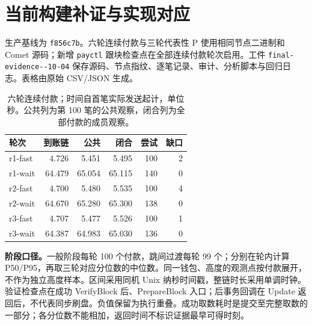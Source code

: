 \section{当前构建补证与实现对应}
\label{supp:final-evidence}
生产基线为 \texttt{f856c7b}。六轮连续付款与三轮代表性 P 使用相同节点二进制和 Comet 源码；新增 \texttt{payctl} 跟块检查点在全部连续付款轮次启用。工件 \texttt{final-evidence--10-04} 保存源码、节点指纹、逐笔记录、审计、分析脚本与回归日志。表格由原始 CSV/JSON 生成。

\begin{table}[htbp]
\centering\small
\caption{六轮连续付款；时间自首笔实际发送起计，单位秒。公共列为第 100 笔的公共观察，闭合列为全部付款的成员观察。}
\label{tab:final-evidence-chain}
\begin{tabular}{lrrrrr}\toprule
轮次 & 到账链 & 公共 & 闭合 & 尝试 & 缺口 \\\midrule
r1-fast & 4.726 & 5.451 & 5.495 & 100 & 2 \\
r1-wait & 64.479 & 65.054 & 65.115 & 140 & 0 \\
r2-fast & 4.700 & 5.480 & 5.535 & 100 & 4 \\
r2-wait & 64.670 & 65.280 & 65.300 & 138 & 0 \\
r3-fast & 4.707 & 5.477 & 5.526 & 100 & 1 \\
r3-wait & 64.387 & 64.983 & 65.030 & 136 & 0 \\
\bottomrule\end{tabular}
\end{table}

\noindent\textbf{阶段口径。}一般阶段每轮 100 个付款，跳间过渡每轮 99 个；分别在轮内计算 P50/P95，再取三轮对应分位数的中位数。同一钱包、高度的观测点按付款展开，不作为独立高度样本。区间采用同机 Unix 纳秒时间戳，整链时长采用单调时钟。验证检查点在成功 VerifyBlock 后、PrepareBlock 入口；后事务回调在 Update 返回后，不代表同步刷盘。负值保留为执行重叠。成功取数耗时是提交至完整取数的一部分；各分位数不能相加，返回时间不标识证据最早可得时刻。

